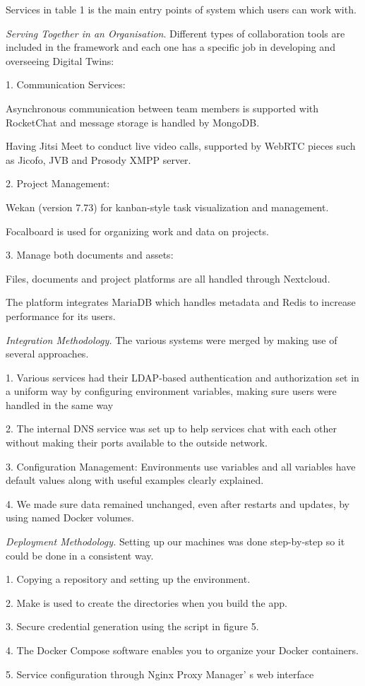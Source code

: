 \begin{multicols}{2}
Services in table 1 is the main entry points of system which users can
work with.

\emph{Serving Together in an Organisation}. Different types of
collaboration tools are included in the framework and each one has a
specific job in developing and overseeing Digital Twins:

1. Communication Services:

Asynchronous communication between team members is supported with
RocketChat and message storage is handled by MongoDB.

Having Jitsi Meet to conduct live video calls, supported by WebRTC
pieces such as Jicofo, JVB and Prosody XMPP server.

2. Project Management:

Wekan (version 7.73) for kanban-style task visualization and management.

Focalboard is used for organizing work and data on projects.

3. Manage both documents and assets:

Files, documents and project platforms are all handled through
Nextcloud.

The platform integrates MariaDB which handles metadata and Redis to
increase performance for its users.

\emph{Integration Methodology.} The various systems were merged by
making use of several approaches.

1. Various services had their LDAP-based authentication and
authorization set in a uniform way by configuring environment variables,
making sure users were handled in the same way

2. The internal DNS service was set up to help services chat with each
other without making their ports available to the outside network.

3. Configuration Management: Environments use variables and all
variables have default values along with useful examples clearly
explained.

4. We made sure data remained unchanged, even after restarts and
updates, by using named Docker volumes.

\emph{Deployment Methodology.} Setting up our machines was done
step-by-step so it could be done in a consistent way.

1. Copying a repository and setting up the environment.

2. Make is used to create the directories when you build the app.

3. Secure credential generation using the script in figure 5.

4. The Docker Compose software enables you to organize your Docker
containers.

5. Service configuration through Nginx Proxy Manager' s
web interface
\end{multicols}

